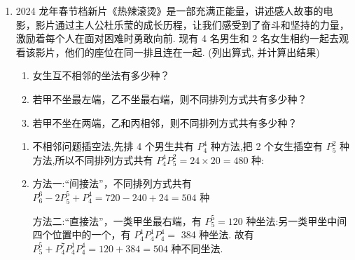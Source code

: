 \begin{enumerate}
\begin{enumerate}
\begin{jieda}
\begin{enumerate}
                由分步乘法计数原理,共有 $P_{4}^{4} \times  P_{4}^{4} = {24} \times  {24} = {576}$ (种) 排法.
                
                \item 先将 3 名男生排好，共有 $P_{3}^{3}$ 种排法，在这 3 名男生中间以及两边共 4 个空位中插入 4 名女生，共有 $P_{4}^{4}$ 种排法，再由分步乘法计数原理,可得共有 $P_{3}^{3} \times  P_{4}^{4} = 6 \times  {24} = {144}$ (种) 排法.

                \item 先将甲、乙、丙以外的其余 4 人排好，共有 $P_{4}^{4}$ 种排法，由于甲、乙相邻，则有 $P_{2}^{2}$ 种排法，最后将排好的甲、乙这个整体与丙分别插入原先排好的 4 人产生:的 5 个空隙中，共有 $P_{5}^{2}$ 种排法
                
                由分步乘法计数原理,可得共有 $P_{4}^{4} \times  P_{2}^{2} \times  P_{5}^{2} = {24} \times  2 \times  {20} = {960}$ (种) 排法.
            \end{enumerate}
        \end{jieda}
        \item 2024 龙年春节档新片《热辣滚烫》是一部充满正能量，讲述感人故事的电影，影片通过主人公杜乐莹的成长历程，让我们感受到了奋斗和坚持的力量，激励着每个人在面对困难时勇敢向前. 现有 4 名男生和 2 名女生相约一起去观看该影片，他们的座位在同一排且连在一起. (列出算式, 并计算出结果)
        \begin{enumerate}
            \item 女生互不相邻的坐法有多少种？
            \item 若甲不坐最左端，乙不坐最右端，则不同排列方式共有多少种？
            \item 若甲不坐在两端，乙和丙相邻，则不同排列方式共有多少种？
        \end{enumerate}
        \begin{jieda}
            \begin{enumerate}
                \item 不相邻问题插空法,先排 4 个男生共有 $P_{4}^{4}$ 种方法,把 2 个女生插空有 $P_{5}^{2}$ 种方法,所以不同排列方式共有 $P_{4}^{4}P_{5}^{2} = {24} \times  {20} = {480}$ 种:
                
                \item 方法一:“间接法”，不同排列方式共有 $P_{6}^{6} - 2P_{5}^{5} + P_{4}^{4} = {720} - {240} + {24} = {504}$ 种
                
                方法二:“直接法”，一类甲坐最右端，有 $P_{5}^{5} = {120}$ 种坐法:另一类甲坐中间四个位置中的一个，有 $P_{4}^{1}P_{4}^{1}P_{4}^{4} =$ 384 种坐法. 故有 $P_{5}^{5} + P_{4}^{7}P_{4}^{1}P_{4}^{4} = {120} + {384} = {504}$ 种不同坐法.
                

\end{enumerate}
\end{jieda}
\end{enumerate}
\end{enumerate}
